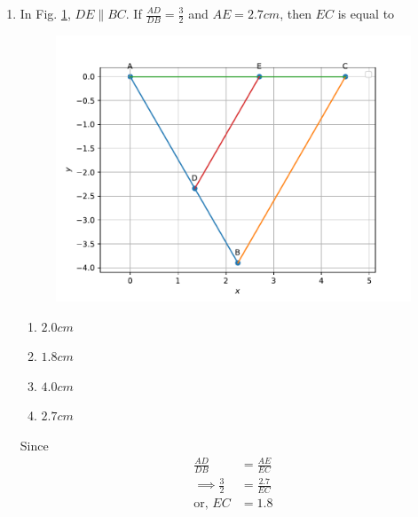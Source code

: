 \documentclass[journal,12pt,twocolumn]{IEEEtran}
\begin{document}
\begin{enumerate}
\item In Fig. 
	  \ref{fig:matrix-10-19.pdf},
$DE \parallel BC$. If $\frac{AD}{DB} = \frac{3}{2}$ and $AE = 2.7cm$, then $EC$ is equal to 
  \begin{figure}
	  \centering 
	  \includegraphics[width=\columnwidth]{figs/matrix-10-19.pdf}
	  \caption{}
	  \label{fig:matrix-10-19.pdf}
	  \end{figure}
\begin{enumerate}
    \item $2.0 cm$
    \item $1.8 cm$
    \item $4.0 cm$
    \item $2.7 cm$
\end{enumerate}
\solution Since 
\begin{align}
	\frac{AD}{DB}  &= 
	\frac{AE}{EC}
	\\
	\implies \frac{3}{2}&= \frac{2.7}{EC}
	\\
	\text{or, }
	EC & = 1.8
\end{align}

 


\end{enumerate}
\end{document}
